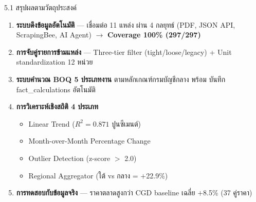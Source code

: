 \documentclass[aspectratio=169,11pt]{beamer}
\begin{document}
\begin{frame}{5.1 สรุปผลตามวัตถุประสงค์}
  \footnotesize
  \begin{enumerate}
    \item \textbf{ระบบดึงข้อมูลอัตโนมัติ} --- เชื่อมต่อ 11 แหล่ง ผ่าน 4 กลยุทธ์
          (PDF, JSON API, ScrapingBee, AI Agent) $\to$ \textbf{Coverage 100\%
          (297/297)}
    \item \textbf{การจับคู่รายการข้ามแหล่ง} --- Three-tier filter (tight/loose/legacy)
          + Unit standardization 12 หน่วย
    \item \textbf{ระบบคำนวณ BOQ 5 ประเภทงาน} ตามหลักเกณฑ์กรมบัญชีกลาง พร้อม
          บันทึก fact\_calculations อัตโนมัติ
    \item \textbf{การวิเคราะห์เชิงสถิติ 4 ประเภท}
          \begin{itemize}
            \item Linear Trend ($R^2 = 0.871$ ปูนซีเมนต์)
            \item Month-over-Month Percentage Change
            \item Outlier Detection (z-score $>$ 2.0)
            \item Regional Aggregator (ใต้ vs กลาง = $+$22.9\%)
          \end{itemize}
    \item \textbf{การทดสอบกับข้อมูลจริง} --- ราคาตลาดสูงกว่า CGD baseline เฉลี่ย
          $+$8.5\% (37 คู่ราคา)
  \end{enumerate}
\end{frame}
\end{document}
